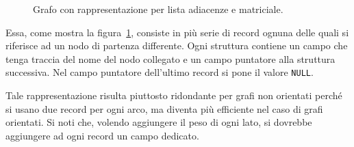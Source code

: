 \begin{itemize}
\begin{figure}
	\centering
{}

	\caption[Lista adiacenze]{Grafo con rappresentazione per lista adiacenze e matriciale.}
	\label{fig:adi}
\end{figure}
Essa, come mostra la figura~\ref{fig:adi}, consiste in più serie di record ognuna delle quali si riferisce ad un nodo di partenza differente.
Ogni struttura contiene un campo che tenga traccia del nome del nodo collegato e un campo puntatore alla struttura successiva.
Nel campo puntatore dell'ultimo record si pone il valore \lstinline!NULL!.

Tale rappresentazione risulta piuttosto ridondante per grafi non orientati perché si usano due record per ogni arco, ma diventa più efficiente nel caso di grafi orientati.
Si noti che, volendo aggiungere il peso di ogni lato, si dovrebbe aggiungere ad ogni record un campo dedicato.
\end{itemize}